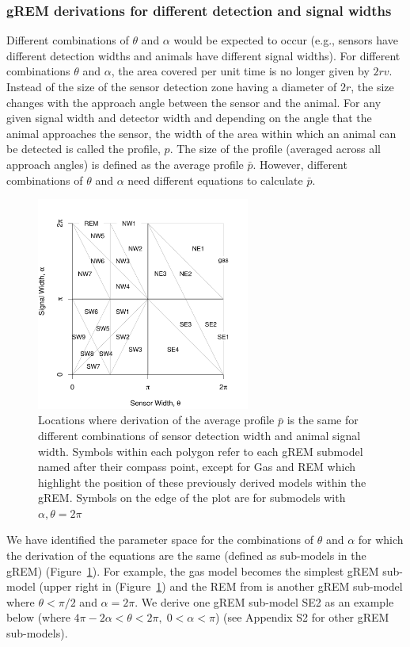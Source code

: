 \documentclass[a4paper,10pt,reqno,oneside]{amsart}
\begin{document}
\subsubsection*{gREM derivations for different detection and signal widths}
Different combinations of $\theta$ and $\alpha$ would be expected to occur (e.g., sensors have different detection widths and animals have different signal widths). For different combinations $\theta$ and $\alpha$, the area covered per unit time is no longer given by $2rv$. Instead of the size of the sensor detection zone having a diameter of $2r$, the size changes with the approach angle between the sensor and the animal. For any given signal width and detector width and depending on the angle that the animal approaches the sensor, the width of the area within which an animal can be detected is called the profile, $p$. The size of the profile (averaged across all approach angles) is defined as the average profile $\bar{p}$. However, different combinations of $\theta$ and $\alpha$ need different equations to calculate $\bar{p}$. 

\begin{figure}
\centering
\includegraphics[width=7cm]{imgs/equalRegions.pdf}
\caption{Locations where derivation of the average profile $\bar{p}$ is the same for different combinations of sensor detection width and animal signal width. Symbols within each polygon refer to each gREM submodel named after their compass point, except for Gas and REM which highlight the position of these previously derived models within the gREM. Symbols on the edge of the plot are for submodels with $\alpha, \theta = 2\pi$}
\label{f:equalRegions}
\end{figure}

We have identified the parameter space for the combinations of $\theta$ and $\alpha$ for which the derivation of the equations are the same (defined as sub-models in the gREM) (Figure~\ref{f:equalRegions}). For example, the gas model becomes the simplest gREM sub-model (upper right in (Figure~\ref{f:equalRegions}) and the REM from \citep{rowcliffe2008estimating} is another gREM sub-model where $\theta<\pi/2$ and $\alpha = 2\pi$. We derive one gREM sub-model SE2 as an example below (where $4 \pi - 2 \alpha < \theta < 2\pi ,\; 0 < \alpha <\pi$) (see Appendix S2 for other gREM sub-models).
\end{document}
